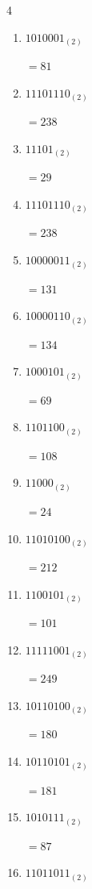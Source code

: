 \begin{multicols}{4}
\begin{enumerate}
        $=30$

  \item $1010001_{(2)}$

        $=81$

\columnbreak %

\resetques

  \item $11101110_{(2)}$

        $=238$

  \item $11101_{(2)}$

        $=29$

  \item $11101110_{(2)}$

        $=238$

  \item $10000011_{(2)}$

        $=131$

  \item $10000110_{(2)}$

        $=134$

  \item $1000101_{(2)}$

        $=69$

  \item $1101100_{(2)}$

        $=108$

  \item $11000_{(2)}$

        $=24$

  \item $11010100_{(2)}$

        $=212$

  \item $1100101_{(2)}$

        $=101$

  \item $11111001_{(2)}$

        $=249$

  \item $10110100_{(2)}$

        $=180$

  \item $10110101_{(2)}$

        $=181$

  \item $1010111_{(2)}$

        $=87$

  \item $11011011_{(2)}$


\end{enumerate}
\end{multicols}
